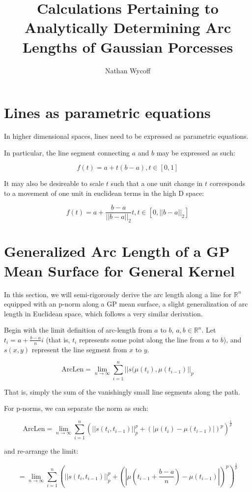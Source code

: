 \documentclass{article}
\title{Calculations Pertaining to Analytically Determining Arc Lengths of Gaussian Porcesses}
\author{Nathan Wycoff}
\begin{document}
	\maketitle
	
	\section{Lines as parametric equations}
	
	In higher dimensional spaces, lines need to be expressed as parametric equations.
	
	In particular, the line segment connecting $a$ and $b$ may be expressed as such:
	
	$$f(t) = a + t(b-a), t \in [0,1]$$
	
	It may also be desireable to scale $t$ such that a one unit change in $t$ corresponds to a movement of one unit in euclidean terms in the high D space:
	
	$$f(t) = a + \frac{b - a}{||b - a||_2} t, t \in [0,||b - a||_2]$$
	
	\section{Generalized Arc Length of a GP Mean Surface for General Kernel}
	
    In this section, we will semi-rigorously derive the arc length along a line for $\mathbb{R}^n$ equipped with an p-norm along a GP mean surface, a slight generalization of arc length in Euclidean space, which follows a very similar derivation.
	
    Begin with the limit definition of arc-length from $a$ to $b$, $a,b \in \mathbb{R}^n$. Let $t_i = a + \frac{b-a}{n}i$ (that is, $t_i$ represents some point along the line from $a$ to $b$), and $s(x,y)$ represent the line segment from $x$ to $y$.

    $$\textrm{ArcLen} = \lim_{n\to\infty} \sum_{i=1}^{n} ||s(\mu(t_i), \mu(t_{i-1})||_p$$

    That is, simply the sum of the vanishingly small line segments along the path.

    For p-norms, we can separate the norm as such:

    $$\textrm{ArcLen} = \lim_{n\to\infty} \sum_{i=1}^{n} (||s(t_i,t_{i-1})||_p^p + (|\mu(t_i) - \mu(t_{i-1})|)^p)^{\frac{1}{p}}$$

	and re-arrange the limit:

    $$ = \lim_{n\to\infty} \sum_{i=1}^{n} (||s(t_i,t_{i-1})||_p^p + (|\mu(t_{i-1} + \frac{b-a}{n}) - \mu(t_{i-1})|)^p)^{\frac{1}{p}}$$
    
\end{document}
